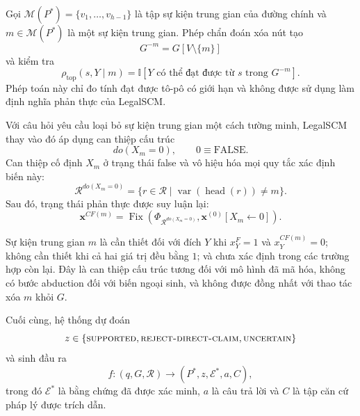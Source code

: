 Gọi $\mathcal{M}(P^*)=\{v_1,\ldots,v_{h-1}\}$ là tập sự kiện trung gian của
đường chính và $m\in\mathcal{M}(P^*)$ là một sự kiện trung gian. Phép chẩn đoán
xóa nút tạo
\begin{equation}
G^{-m}=G[V\setminus\{m\}]
\end{equation}
và kiểm tra
\begin{equation}
\rho_{\mathrm{top}}(s,Y\mid m)
=
\mathbb{I}
[Y\text{ có thể đạt được từ }s\text{ trong }G^{-m}].
\label{eq:topological_ablation}
\end{equation}
Phép toán này chỉ đo tính đạt được tô-pô có giới hạn và không được sử dụng làm
định nghĩa phản thực của LegalSCM.

Với câu hỏi yêu cầu loại bỏ sự kiện trung gian một cách tường minh, LegalSCM
thay vào đó áp dụng can thiệp cấu trúc \cite{pearl2009causality}
\begin{equation}
do(X_m=0),\qquad 0\equiv\mathrm{FALSE}.
\end{equation}
Can thiệp cố định $X_m$ ở trạng thái false và vô hiệu hóa mọi quy tắc xác định
biến này:
\begin{equation}
\mathcal{R}^{do(X_m=0)}
=
\{r\in\mathcal{R}\mid
\operatorname{var}(\operatorname{head}(r))\neq m\}.
\end{equation}
Sau đó, trạng thái phản thực được suy luận lại:
\begin{equation}
\mathbf{x}^{CF(m)}
=
\operatorname{Fix}\!\left(
\Phi_{\mathcal{R}^{do(X_m=0)}},
\mathbf{x}^{(0)}[X_m\leftarrow0]
\right).
\label{eq:cf_fixed_point}
\end{equation}

Sự kiện trung gian $m$ là cần thiết đối với đích $Y$ khi $x_Y^{F}=1$ và
$x_Y^{CF(m)}=0$; không cần thiết khi cả hai giá trị đều bằng $1$; và chưa xác
định trong các trường hợp còn lại. Đây là can thiệp cấu trúc tương đối với mô
hình đã mã hóa, không có bước abduction đối với biến ngoại sinh, và không được
đồng nhất với thao tác xóa $m$ khỏi $G$.

Cuối cùng, hệ thống dự đoán
\begin{equation}
z\in\{
\textsc{supported},
\textsc{reject-direct-claim},
\textsc{uncertain}
\}
\end{equation}
và sinh đầu ra
\begin{equation}
f:(q,G,\mathcal{R})
\rightarrow(P^*,z,\mathcal{E}^*,a,C),
\end{equation}
trong đó $\mathcal{E}^*$ là bằng chứng đã được xác minh, $a$ là câu trả lời và
$C$ là tập căn cứ pháp lý được trích dẫn.
